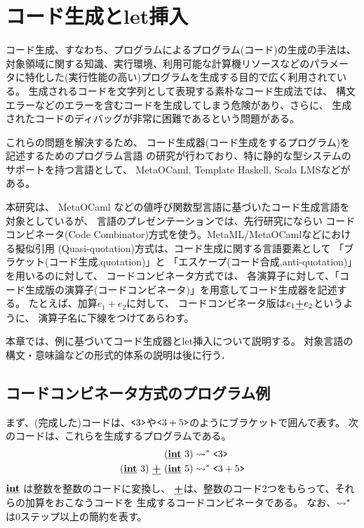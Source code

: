 
\section{コード生成とlet挿入}

コード生成、すなわち、プログラムによるプログラム(コード)の生成の手法は、
対象領域に関する知識、実行環境、利用可能な計算機リソースなどのパラメー
タに特化した(実行性能の高い)プログラムを生成する目的で広く利用されている。
生成されるコードを文字列として表現する素朴なコード生成法では、
構文エラーなどのエラーを含むコードを生成してしまう危険があり、さらに、
生成されたコードのディバッグが非常に困難であるという問題がある。

これらの問題を解決するため、
コード生成器(コード生成をするプログラム)を記述するためのプログラム言語
の研究が行わており、特に静的な型システムのサポートを持つ言語として、
MetaOCaml, Template Haskell, Scala LMSなどがある。

本研究は、
MetaOCaml などの値呼び関数型言語に基づいたコード生成言語を対象としているが、
言語のプレゼンテーションでは、先行研究にならい
コードコンビネータ(Code Combinator)方式を使う。MetaML/MetaOCamlなどにおける擬似引用
(Quasi-quotation)方式は、コード生成に関する言語要素として
「ブラケット(コード生成,quotation)」と
「エスケープ(コード合成,anti-quotation)」を用いるのに対して、
コードコンビネータ方式では、
各演算子に対して、「コード生成版の演算子(コードコンビネータ)」を用意してコード生成器を記述する。
たとえば、加算$e_1+e_2$に対して、
コードコンビネータ版は$e_1 \underline{\textbf{+}} e_2$というように、
演算子名に下線をつけてあらわす。

本章では、例に基づいてコード生成器とlet挿入について説明する。
対象言語の構文・意味論などの形式的体系の説明は後に行う．

\subsection{コードコンビネータ方式のプログラム例}

まず、(完成した)コードは、$\texttt{<}{3}\texttt{>}$や$\texttt{<}{3+5}\texttt{>}$のようにブラケットで囲んで表す。
次のコードは、これらを生成するプログラムである。
\begin{align*}
(\underline{\textbf{int}}~3)   & \leadsto^* \texttt{<}{3}\texttt{>} \\
(\underline{\textbf{int}}~3)~ \underline{\textbf{+}}~ (\underline{\textbf{int}}~5) & \leadsto^* \texttt{<}{3 + 5}\texttt{>}
\end{align*}
$\underline{\textbf{int}}$ は整数を整数のコードに変換し、
$\underline{\textbf{+}}$は、整数のコード2つをもらって、それらの加算をおこなうコードを
生成するコードコンビネータである。
なお、$\leadsto^*$は0ステップ以上の簡約を表す。

